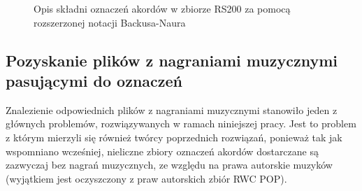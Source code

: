 \begin{figure}[h]
    \caption{Opis składni oznaczeń akordów w zbiorze RS200 za pomocą rozszerzonej notacji Backusa-Naura}
    \label{fig:rs200_dt_syntax}
    {\scriptsize }
\end{figure}

\subsection{Pozyskanie plików z nagraniami muzycznymi pasującymi do oznaczeń}

Znalezienie odpowiednich plików z nagraniami muzycznymi stanowiło jeden z głównych problemów,
rozwiązywanych w ramach niniejszej pracy. Jest to problem z którym mierzyli się również twórcy
poprzednich rozwiązań, ponieważ tak jak wspomniano wcześniej, nieliczne zbiory oznaczeń
akordów dostarczane są zazwyczaj bez nagrań muzycznych, ze względu na prawa autorskie muzyków
(wyjątkiem jest oczyszczony z praw autorskich zbiór RWC POP).

